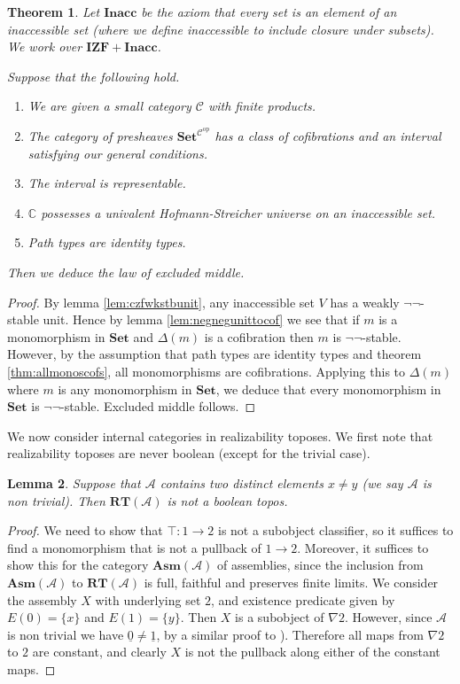 \documentclass[a4paper]{amsart}
\newtheorem{theorem}{Theorem}[section]
\newtheorem{lemma}[theorem]{Lemma}
\theoremstyle{definition}
\newcommand{\cat}[1]{\mathbb{#1}}
\newcommand{\catc}{\cat{C}}
\newcommand{\set}{\mathbf{Set}}
\newcommand{\opcat}[1]{{#1}^\mathrm{op}}
\newcommand{\smcat}[1]{\mathcal{#1}}
\newcommand{\preshf}[1]{\set^{\opcat{#1}}}
\newcommand{\izf}{\mathbf{IZF}}
\newcommand{\inacc}{\mathbf{Inacc}}
\newcommand{\asm}{\mathbf{Asm}}
\newcommand{\pcaa}{\mathcal{A}}
\newcommand{\rt}{\mathbf{RT}}
\begin{document}
\begin{theorem}
  Let $\inacc$ be the axiom that every set is an element of an
  inaccessible set (where we define inaccessible to include closure
  under subsets). We work over $\izf + \inacc$.

  Suppose that the following hold.
  \begin{enumerate}
  \item We are given a small category $\smcat{C}$ with finite products.
  \item The category of presheaves $\preshf{\smcat{C}}$ has a class of
    cofibrations and an interval satisfying our general conditions.
  \item The interval is representable.
  \item $\catc$ possesses a univalent Hofmann-Streicher universe on an
    inaccessible set.
  \item Path types are identity types.
  \end{enumerate}

  Then we deduce the law of excluded middle.
\end{theorem}

\begin{proof}
  By lemma \ref{lem:czfwkstbunit}, any inaccessible set $V$ has a
  weakly $\neg \neg$-stable unit. Hence by
  lemma \ref{lem:negnegunittocof} we see that if $m$ is a monomorphism
  in $\set$ and $\Delta(m)$ is a cofibration then $m$ is
  $\neg \neg$-stable. However, by the assumption that path types are
  identity types and theorem \ref{thm:allmonoscofs}, all monomorphisms
  are cofibrations. Applying this to $\Delta(m)$ where $m$ is any
  monomorphism in $\set$, we deduce that every monomorphism in $\set$
  is $\neg \neg$-stable. Excluded middle follows.
\end{proof}

We now consider internal categories in realizability toposes. We first
note that realizability toposes are never boolean (except for the
trivial case).

\begin{lemma}
  \label{lem:rtnotboolean}
  Suppose that $\pcaa$ contains two distinct elements $x \neq y$ (we
  say $\pcaa$ is \emph{non trivial}). Then $\rt(\pcaa)$ is not a
  boolean topos.
\end{lemma}

\begin{proof}
  We need to show that $\top \colon 1 \to 2$ is not a subobject
  classifier, so it suffices to find a monomorphism that is not a
  pullback of $1 \to 2$. Moreover, it suffices to show this for the
  category $\asm(\pcaa)$ of assemblies, since the inclusion from
  $\asm(\pcaa)$ to $\rt(\pcaa)$ is full, faithful and preserves finite
  limits. We consider the assembly $X$ with underlying set $2$, and
  existence predicate given by $E(0) = \{x\}$ and $E(1) = \{y\}$. Then
  $X$ is a subobject of $\nabla 2$. However, since $\pcaa$ is non
  trivial we have $\underline{0} \neq \underline{1}$, by a similar
  proof to \cite[Proposition 1.3.1, part iii]{vanoosten}). Therefore all
  maps from $\nabla 2$ to $2$ are constant, and clearly $X$ is not the
  pullback along either of the constant maps.
\end{proof}
\end{document}
